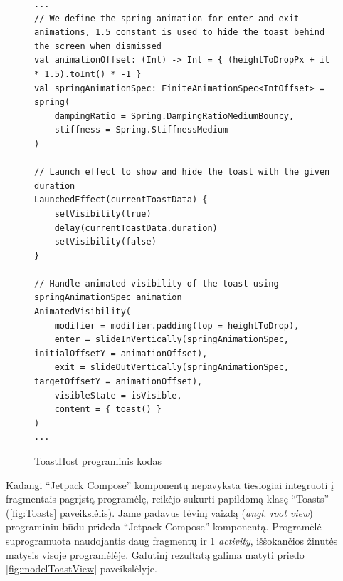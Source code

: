 \begin{figure}[htbp!]
    \centering
    \begin{verbatim}
...
// We define the spring animation for enter and exit animations, 1.5 constant is used to hide the toast behind the screen when dismissed
val animationOffset: (Int) -> Int = { (heightToDropPx + it * 1.5).toInt() * -1 }
val springAnimationSpec: FiniteAnimationSpec<IntOffset> = spring(
    dampingRatio = Spring.DampingRatioMediumBouncy,
    stiffness = Spring.StiffnessMedium
)

// Launch effect to show and hide the toast with the given duration
LaunchedEffect(currentToastData) {
    setVisibility(true)
    delay(currentToastData.duration)
    setVisibility(false)
}

// Handle animated visibility of the toast using springAnimationSpec animation
AnimatedVisibility(
    modifier = modifier.padding(top = heightToDrop),
    enter = slideInVertically(springAnimationSpec, initialOffsetY = animationOffset),
    exit = slideOutVertically(springAnimationSpec, targetOffsetY = animationOffset),
    visibleState = isVisible,
    content = { toast() }
)
...
    \end{verbatim}
    \caption{ToastHost programinis kodas}
    \label{fig:ToastHost}
\end{figure}

\newpage
Kadangi \enquote{Jetpack Compose} komponentų nepavyksta tiesiogiai integruoti į fragmentais pagrįstą programėlę, reikėjo sukurti papildomą klasę \enquote{Toasts} (\ref{fig:Toasts} paveikslėlis). Jame padavus tėvinį vaizdą (\emph{angl. root view}) programiniu būdu prideda \enquote{Jetpack Compose} komponentą. Programėlė suprogramuota naudojantis daug fragmentų ir 1 \textit{activity}, iššokančios žinutės matysis visoje programėlėje. Galutinį rezultatą galima matyti priedo \ref{fig:modelToastView} paveikslėlyje.

